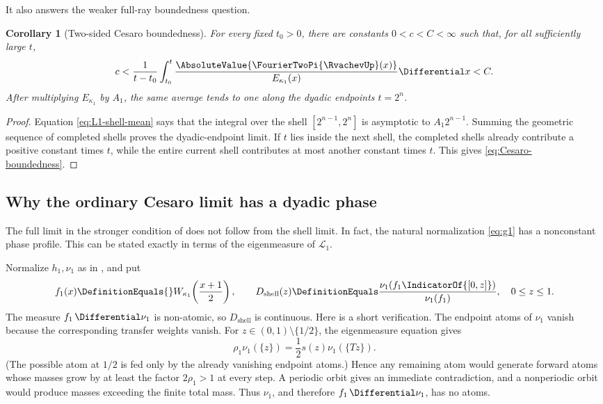 \documentclass[11pt,oneside]{article}
\numberwithin{equation}{section}
\newtheorem{corollary}[theorem]{Corollary}
\theoremstyle{definition}
\theoremstyle{remark}
\newcommand{\ShellLimitDistribution}{D_{\mathrm{shell}}}
\begin{document}
It also answers the weaker full-ray boundedness question.

\begin{corollary}[Two-sided Cesaro boundedness]
\label{cor:Cesaro-boundedness}
For every fixed $t_0>0$, there are constants $0<c<C<\infty$ such that, for all sufficiently
large $t$,
\begin{equation}
 c<\frac1{t-t_0}\int_{t_0}^{t}
 \frac{\AbsoluteValue{\FourierTwoPi{\RvachevUp}(x)}}{E_{\kappa_1}(x)}\Differential x<C.
 \label{eq:Cesaro-boundedness}
\end{equation}
After multiplying $E_{\kappa_1}$ by $A_1$, the same average tends to one along the dyadic
endpoints $t=2^n$.
\end{corollary}

\begin{proof}
Equation \eqref{eq:L1-shell-mean} says that the integral over the shell
$[2^{n-1},2^n]$ is asymptotic to $A_1 2^{n-1}$.  Summing the geometric sequence of completed
shells proves the dyadic-endpoint limit.  If $t$ lies inside the next shell, the completed
shells already contribute a positive constant times $t$, while the entire current shell
contributes at most another constant times $t$.  This gives \eqref{eq:Cesaro-boundedness}.
\end{proof}

\subsection{Why the ordinary Cesaro limit has a dyadic phase}
\label{subsec:phase-profile}

The full limit in the stronger condition of \cite{mse-decay} does not follow from the shell
limit.  In fact, the natural normalization \eqref{eq:g1} has a nonconstant phase profile.
This can be stated exactly in terms of the eigenmeasure of $\mathcal L_1$.

Normalize $h_1,\nu_1$ as in , and put
\[
 f_1(x)\DefinitionEquals{}W_{\kappa_1}\!\left(\frac{x+1}{2}\right),
 \qquad
 \ShellLimitDistribution(z)\DefinitionEquals
 \frac{\nu_1(f_1\IndicatorOf{[0,z]})}{\nu_1(f_1)},
 \quad 0\le z\le1.
 \label{eq:phase-distribution}
\]
The measure $f_1\,\Differential\nu_1$ is non-atomic, so $\ShellLimitDistribution$ is continuous.  Here is a
short verification.  The endpoint atoms of $\nu_1$ vanish because the corresponding
transfer weights vanish.  For $z\in(0,1)\setminus\{1/2\}$, the eigenmeasure equation gives
\[
 \rho_1\nu_1(\{z\})=\frac12s(z)\nu_1(\{Tz\}).
\]
(The possible atom at $1/2$ is fed only by the already vanishing endpoint atoms.)  Hence any
remaining atom would generate forward atoms whose masses grow by at least the factor
$2\rho_1>1$ at every step.  A periodic orbit gives an immediate contradiction, and a
nonperiodic orbit would produce masses exceeding the finite total mass.  Thus $\nu_1$, and
therefore $f_1\,\Differential\nu_1$, has no atoms.
\end{document}
